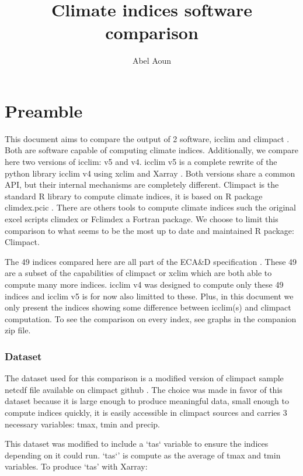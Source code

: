 \documentclass[a4paper,11pt]{article}
\title{Climate indices software comparison}
\author{Abel Aoun}
\begin{document}
\maketitle
\part*{Preamble}
    This document aims to compare the output of 2 software, icclim \cite{gh/icclim} and climpact \cite{gh/climpact}. Both are software capable of computing climate indices.
    Additionally, we compare here two versions of icclim: v5 and v4.
    icclim v5 is a complete rewrite of the python library icclim v4 using xclim \cite{gh/xclim} and Xarray \cite{gh/xarray}. Both versions share a common API, but their internal mechanisms are completely different.
    Climpact is the standard R library to compute climate indices, it is based on R package climdex.pcic \cite{gh/climdex}.
    There are others tools to compute climate indices such the original excel scripts climdex or Fclimdex a Fortran package.
    We choose to limit this comparison to what seems to be the most up to date and maintained R package: Climpact.

    The 49 indices compared here are all part of the ECA\&D specification \cite{doc/ecad_new}.
    These 49 are a subset of the capabilities of climpact or xclim which are both able to compute many more indices.
    icclim v4 was designed to compute only these 49 indices and icclim v5 is for now also limitted to these.
    Plus, in this document we only present the indices showing some difference between icclim(s) and climpact computation.
    To see the comparison on every index, see graphs in the companion zip file.

    \section{Dataset}
        The dataset used for this comparison is a modified version of climpact sample netcdf file available on climpact github \cite{gh/climpact}.
        The choice was made in favor of this dataset because it is large enough to produce meaningful data,
        small enough to compute indices quickly, it is easily accessible in climpact sources and carries 3 necessary variables: tmax, tmin and precip.

        This dataset was modified to include a `tas` variable to ensure the indices depending on it could
        run. `tas`' is compute as the average of tmax and tmin variables.
        To produce `tas' with Xarray:
\end{document}
